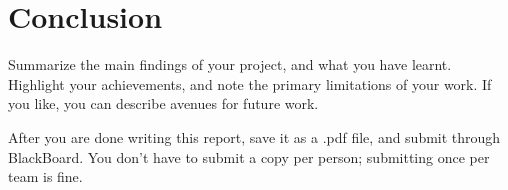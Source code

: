\section{Conclusion}
Summarize the main findings of your project, and what you have learnt. Highlight your achievements, and note the primary limitations of your work. If you like, you can describe avenues for future work.

After you are done writing this report, save it as a .pdf file, and submit through BlackBoard. You don't have to submit a copy per person; submitting once per team is fine.
